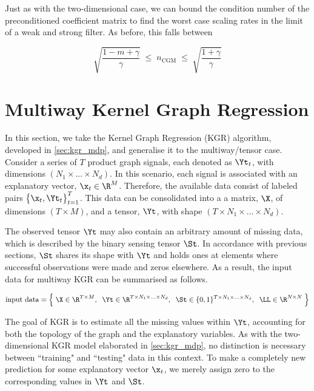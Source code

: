 Just as with the two-dimensional case, we can bound the condition number of the preconditioned coefficient matrix to find the worst case scaling rates in the limit of a weak and strong filter. As before, this falls between

$$
\sqrt{\frac{1 - m + \gamma}{\gamma}} \; \leq \; n_{\text{CGM}} \; \leq \; \sqrt{\frac{1+\gamma}{\gamma}}
$$

\section{Multiway Kernel Graph Regression}

\label{sec:kgr_dd}

In this section, we take the Kernel Graph Regression (KGR) algorithm, developed in \cref{sec:kgr_mdp}, and generalise it to the multiway/tensor case. Consider a series of $T$ product graph signals, each denoted as $\Yt_t$, with dimensions $(N_1 \times ... \times N_d)$. In this scenario, each signal is associated with an explanatory vector, $\x_t \in \R^M$. Therefore, the available data consist of labeled pairs $\big\{\x_t, \Yt_t\big\}_{t=1}^T$. This data can be consolidated into a a matrix, $\X$, of dimensions $(T \times M)$, and a tensor, $\Yt$, with shape $(T \times N_1 \times ... \times N_d)$.

The observed tensor $\Yt$ may also contain an arbitrary amount of missing data, which is described by the binary sensing tensor $\St$. In accordance with previous sections, $\St$ shares its shape with $\Yt$ and holds ones at elements where successful observations were made and zeros elsewhere. As a result, the input data for multiway KGR can be summarised as follows.

\begin{equation*}
    \text{input data} = \Big\{ \; \X \in \R^{T \times M}, \;\; \Yt \in \R^{T \times N_1 \times ... \times N_d}, \;\; \St \in \{0, 1\}^{T \times N_1 \times ... \times N_d} , \;\; \LL \in \R^{N \times N} \; \Big\}
\end{equation*}

The goal of KGR is to estimate all the missing values within $\Yt$, accounting for both the topology of the graph and the explanatory variables. As with the two-dimensional KGR model elaborated in \cref{sec:kgr_mdp}, no distinction is necessary between ``training" and ``testing" data in this context. To make a completely new prediction for some explanatory vector $\x_t$, we merely assign zero to the corresponding values in $\Yt$ and $\St$.

